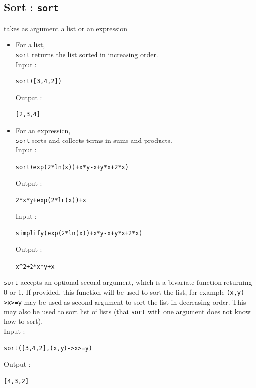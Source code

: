 \documentclass[a4paper,11pt]{book}
\begin{document}
\subsection{Sort : {\tt sort}}
 takes as argument a list or an expression.
\begin{itemize}
\item For a list,\\
{\tt sort} returns the list sorted in increasing order.\\
Input :
\begin{center}{\tt sort([3,4,2])}\end{center}
Output :
\begin{center}{\tt [2,3,4]}\end{center}

\item For an expression,\\
 {\tt sort} sorts and  collects terms in sums and products.\\
Input :  
\begin{center}{\tt sort(exp(2*ln(x))+x*y-x+y*x+2*x)}\end{center}
Output :
\begin{center}{\tt 2*x*y+exp(2*ln(x))+x}\end{center}  
Input :  
\begin{center}{\tt simplify(exp(2*ln(x))+x*y-x+y*x+2*x)}\end{center}
Output :
\begin{center}{\tt x\verb|^|2+2*x*y+x}\end{center}  
\end{itemize}
{\tt sort} accepts an optional second argument, which is a bivariate
function returning 0 or 1. If provided, this function
will be used to sort the list, for example
{\tt (x,y)->x>=y} may be used as second argument
to sort the list in decreasing order.
This may also be used to sort list of lists 
(that {\tt sort} with one argument does not know how to sort).\\
Input :
\begin{center}{\tt sort([3,4,2],(x,y)->x>=y)}\end{center}
Output :
\begin{center}{\tt [4,3,2]}\end{center}
\end{document}
